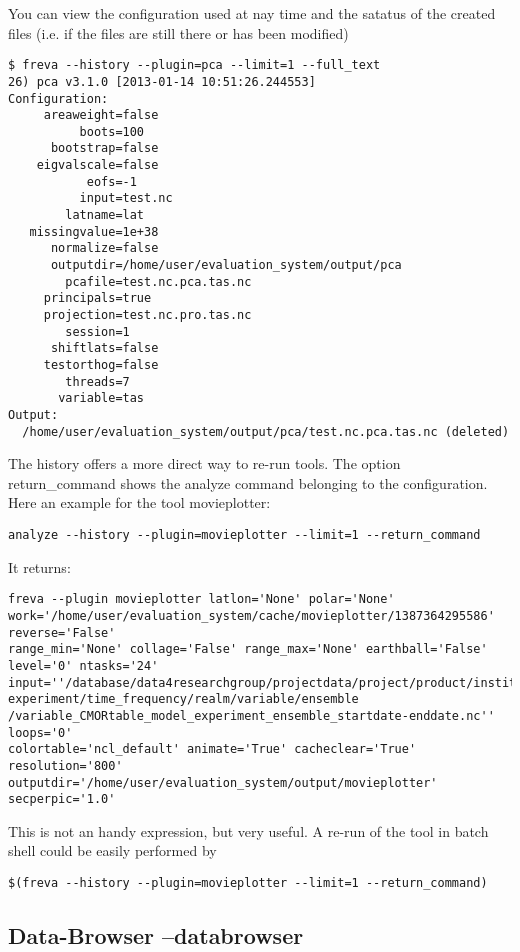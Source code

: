\documentclass[a4paper,11pt]{ltxdoc}
\begin{document}
You can view the configuration used at nay time and the satatus of the created files (i.e. if the files are still there or has been modified)
\begin{verbatim}
$ freva --history --plugin=pca --limit=1 --full_text
26) pca v3.1.0 [2013-01-14 10:51:26.244553] 
Configuration:
     areaweight=false
          boots=100
      bootstrap=false
    eigvalscale=false
           eofs=-1
          input=test.nc
        latname=lat
   missingvalue=1e+38
      normalize=false
      outputdir=/home/user/evaluation_system/output/pca
        pcafile=test.nc.pca.tas.nc
     principals=true
     projection=test.nc.pro.tas.nc
        session=1
      shiftlats=false
     testorthog=false
        threads=7
       variable=tas
Output:
  /home/user/evaluation_system/output/pca/test.nc.pca.tas.nc (deleted)
\end{verbatim}
The history offers a more direct way to re-run tools. The option return\_command shows the analyze command belonging to the configuration. Here an example for the tool movieplotter:
\begin{verbatim}
analyze --history --plugin=movieplotter --limit=1 --return_command
\end{verbatim}

It returns:
\begin{verbatim}
freva --plugin movieplotter latlon='None' polar='None' 
work='/home/user/evaluation_system/cache/movieplotter/1387364295586' reverse='False' 
range_min='None' collage='False' range_max='None' earthball='False' level='0' ntasks='24' 
input=''/database/data4researchgroup/projectdata/project/product/institute/model/
experiment/time_frequency/realm/variable/ensemble
/variable_CMORtable_model_experiment_ensemble_startdate-enddate.nc'' loops='0' 
colortable='ncl_default' animate='True' cacheclear='True' resolution='800' 
outputdir='/home/user/evaluation_system/output/movieplotter' secperpic='1.0'
\end{verbatim}

This is not an handy expression, but very useful. A re-run of the tool in batch shell could be easily performed by
\begin{verbatim}
$(freva --history --plugin=movieplotter --limit=1 --return_command)
\end{verbatim}

\subsection{Data-Browser --databrowser}
\end{document}
